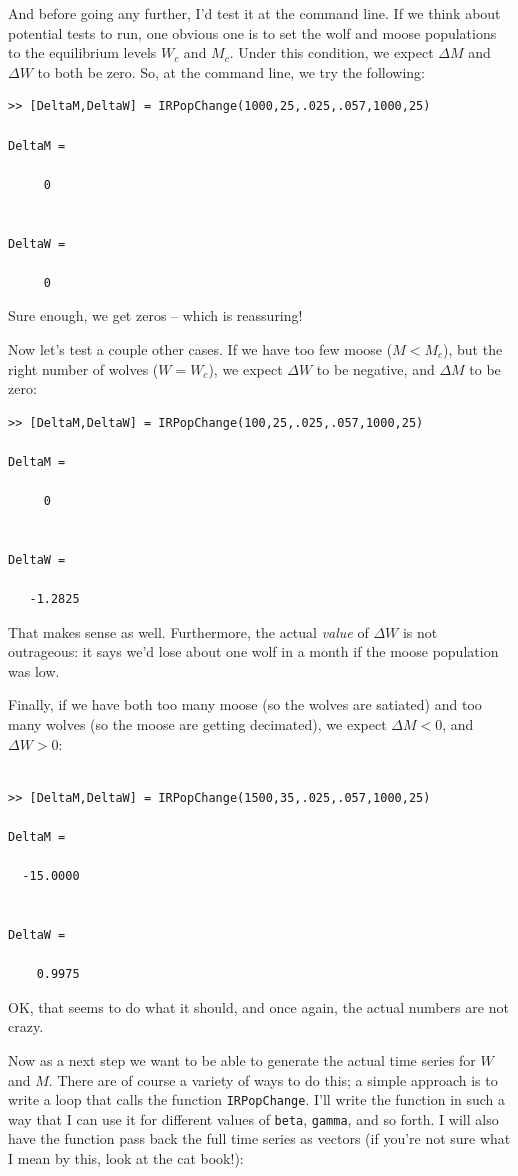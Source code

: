 \documentclass{tufte-handout}
\begin{document}
And before going any further, I'd test it at the command line.  If we think about potential tests to run, one obvious one is to set the wolf and moose populations to the equilibrium levels $W_c$ and $M_c$.  Under this condition, we expect $\Delta M$ and $\Delta W$ to both be zero.  So, at the command line, we try the following:

\begin{verbatim}
>> [DeltaM,DeltaW] = IRPopChange(1000,25,.025,.057,1000,25)

DeltaM =

     0


DeltaW =

     0

\end{verbatim}

Sure enough, we get zeros -- which is reassuring!

Now let's test a couple other cases.  If we have too few moose ($M<M_c$), but the right number of wolves ($W=W_c$), we expect $\Delta W$ to be negative, and $\Delta M$ to be zero:

\begin{verbatim}
>> [DeltaM,DeltaW] = IRPopChange(100,25,.025,.057,1000,25)

DeltaM =

     0


DeltaW =

   -1.2825
\end{verbatim}
That makes sense as well.  Furthermore, the actual {\it value} of $\Delta W$ is not outrageous:  it says we'd lose about one wolf in a month if the moose population was low.  

Finally, if we have both too many moose (so the wolves are satiated) and too many wolves (so the moose are getting decimated), we expect $\Delta M<0$, and $\Delta W>0$:

 \begin{verbatim}

>> [DeltaM,DeltaW] = IRPopChange(1500,35,.025,.057,1000,25)

DeltaM =

  -15.0000


DeltaW =

    0.9975
\end{verbatim}

OK, that seems to do what it should, and once again, the actual numbers are not crazy.

Now as a next step we want to be able to generate the actual time series for $W$ and $M$.  There are of course a variety of ways to do this; a simple approach is to write a loop that calls the function {\tt IRPopChange}.  I'll write the function in such a way that I can use it for different values of {\tt beta}, {\tt gamma}, and so forth.  I will also have the function pass back the full time series as vectors (if you're not sure what I mean by this, look at the cat book!):
\end{document}
